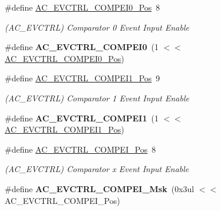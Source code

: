 \begin{DoxyCompactItemize}
\item 
\hypertarget{group___s_a_m_l21___a_c_ga586fb057733a1c4b9f7c81586a2f6854}{}\#define \hyperlink{group___s_a_m_l21___a_c_ga586fb057733a1c4b9f7c81586a2f6854}{A\+C\+\_\+\+E\+V\+C\+T\+R\+L\+\_\+\+C\+O\+M\+P\+E\+I0\+\_\+\+Pos}~8\label{group___s_a_m_l21___a_c_ga586fb057733a1c4b9f7c81586a2f6854}

\begin{DoxyCompactList}\small\item\em (A\+C\+\_\+\+E\+V\+C\+T\+R\+L) Comparator 0 Event Input Enable \end{DoxyCompactList}\item 
\hypertarget{group___s_a_m_l21___a_c_ga14b2e19c7520b2b8d2f53bd753003601}{}\#define {\bfseries A\+C\+\_\+\+E\+V\+C\+T\+R\+L\+\_\+\+C\+O\+M\+P\+E\+I0}~(1 $<$$<$ \hyperlink{group___s_a_m_l21___a_c_ga586fb057733a1c4b9f7c81586a2f6854}{A\+C\+\_\+\+E\+V\+C\+T\+R\+L\+\_\+\+C\+O\+M\+P\+E\+I0\+\_\+\+Pos})\label{group___s_a_m_l21___a_c_ga14b2e19c7520b2b8d2f53bd753003601}

\item 
\hypertarget{group___s_a_m_l21___a_c_ga744dba4ce32648fec57677d38bcf2be5}{}\#define \hyperlink{group___s_a_m_l21___a_c_ga744dba4ce32648fec57677d38bcf2be5}{A\+C\+\_\+\+E\+V\+C\+T\+R\+L\+\_\+\+C\+O\+M\+P\+E\+I1\+\_\+\+Pos}~9\label{group___s_a_m_l21___a_c_ga744dba4ce32648fec57677d38bcf2be5}

\begin{DoxyCompactList}\small\item\em (A\+C\+\_\+\+E\+V\+C\+T\+R\+L) Comparator 1 Event Input Enable \end{DoxyCompactList}\item 
\hypertarget{group___s_a_m_l21___a_c_gaa89dca59d1c1b90d3c7f343711b89c23}{}\#define {\bfseries A\+C\+\_\+\+E\+V\+C\+T\+R\+L\+\_\+\+C\+O\+M\+P\+E\+I1}~(1 $<$$<$ \hyperlink{group___s_a_m_l21___a_c_ga744dba4ce32648fec57677d38bcf2be5}{A\+C\+\_\+\+E\+V\+C\+T\+R\+L\+\_\+\+C\+O\+M\+P\+E\+I1\+\_\+\+Pos})\label{group___s_a_m_l21___a_c_gaa89dca59d1c1b90d3c7f343711b89c23}

\item 
\hypertarget{group___s_a_m_l21___a_c_ga3ecb80c6d080322ab734ade29f0fb26e}{}\#define \hyperlink{group___s_a_m_l21___a_c_ga3ecb80c6d080322ab734ade29f0fb26e}{A\+C\+\_\+\+E\+V\+C\+T\+R\+L\+\_\+\+C\+O\+M\+P\+E\+I\+\_\+\+Pos}~8\label{group___s_a_m_l21___a_c_ga3ecb80c6d080322ab734ade29f0fb26e}

\begin{DoxyCompactList}\small\item\em (A\+C\+\_\+\+E\+V\+C\+T\+R\+L) Comparator x Event Input Enable \end{DoxyCompactList}\item 
\hypertarget{group___s_a_m_l21___a_c_ga232a5136dbe43c2aad98fa1cb2cb702f}{}\#define {\bfseries A\+C\+\_\+\+E\+V\+C\+T\+R\+L\+\_\+\+C\+O\+M\+P\+E\+I\+\_\+\+Msk}~(0x3ul $<$$<$ A\+C\+\_\+\+E\+V\+C\+T\+R\+L\+\_\+\+C\+O\+M\+P\+E\+I\+\_\+\+Pos)\label{group___s_a_m_l21___a_c_ga232a5136dbe43c2aad98fa1cb2cb702f}


\end{DoxyCompactItemize}
